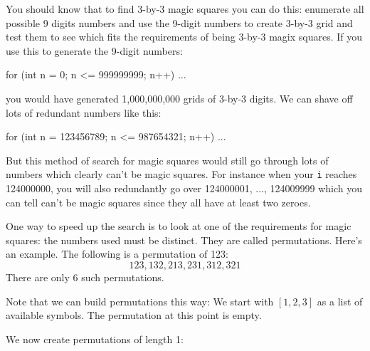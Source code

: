 You should know that to find 3-by-3 magic squares you can do this:
enumerate all possible 9 digits numbers and use the 9-digit numbers to 
create 3-by-3 grid and test them to see which 
fits the requirements of being 3-by-3 magix squares.
If you use this to generate the 9-digit numbers:
\begin{console}
for (int n = 0; n <= 999999999; n++)
{
   ...
}
\end{console}
you would have generated 1,000,000,000 grids of 3-by-3 digits.
We can shave off lots of redundant numbers like this:
\begin{console}
for (int n = 123456789; n <= 987654321; n++)
{
   ...
}
\end{console}
But this method of search for magic squares would still go through
lots of numbers which clearly can't be magic squares.
For instance when your \verb!i! reaches
124000000, you will also redundantly go over 124000001, ..., 124009999
which you can tell can't be magic squares since they all have at least two 
zeroes.

One way to speed up the search is to look at one of the requirements for
magic squares: the numbers used must be distinct.
They are called permutations.
Here's an example. 
The following is a permutation of 123:
\[
123, 132, 213, 231, 312, 321
\]
There are only 6 such permutations.

Note that we can build permutations this way:
We start with $[1,2,3]$ as a list of available symbols.
The permutation at this point is empty.
We now create permutations of length 1:

